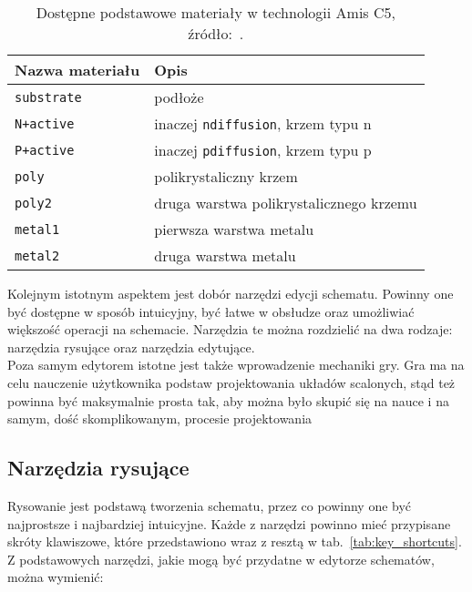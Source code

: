 \newpage
\begin{table}[h]
    \centering
    \caption[Dostępne materiały w technologii Amis C5.]
    {Dostępne podstawowe materiały w technologii Amis C5, źródło:~\cite{amis_params}.}
    \label{tab:amis_materials}
    \begin{tabular}{|l|l|}
        \hline
        Nazwa materiału & Opis \\
        \hline
        \hline
        \texttt{substrate} & podłoże \\
        \hline
        \texttt{N+active} & inaczej \texttt{ndiffusion}, krzem typu n\\
        \hline
        \texttt{P+active} & inaczej \texttt{pdiffusion}, krzem typu p\\
        \hline
        \texttt{poly} & polikrystaliczny krzem \\
        \hline
        \texttt{poly2} & druga warstwa polikrystalicznego krzemu \\
        \hline
        \texttt{metal1} & pierwsza warstwa metalu \\
        \hline
        \texttt{metal2} & druga warstwa metalu \\
        \hline
    \end{tabular}
\end{table}

\indent Kolejnym istotnym aspektem jest dobór narzędzi edycji schematu.
Powinny one być dostępne w sposób intuicyjny, być łatwe w obsłudze oraz umożliwiać większość operacji na schemacie.
Narzędzia te można rozdzielić na dwa rodzaje: narzędzia rysujące oraz narzędzia edytujące. \\
\indent Poza samym edytorem istotne jest także wprowadzenie mechaniki gry.
Gra ma na celu nauczenie użytkownika podstaw projektowania układów scalonych,
stąd też powinna być maksymalnie prosta tak, aby można było skupić się na nauce i na samym,
dość skomplikowanym, procesie projektowania

\subsection{Narzędzia rysujące}
\label{subsec:narzedzia_rysujace}

Rysowanie jest podstawą tworzenia schematu, przez co powinny one być najprostsze i najbardziej intuicyjne.
Każde z narzędzi powinno mieć przypisane skróty klawiszowe,
które przedstawiono wraz z resztą w tab.~\ref{tab:key_shortcuts}. %
Z podstawowych narzędzi, jakie mogą być przydatne w edytorze schematów, można wymienić:

